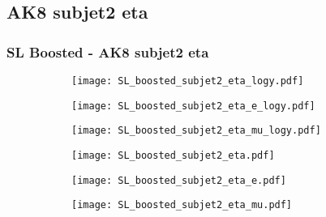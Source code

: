 \documentclass[aspectratio=169,8pt]{beamer}
\begin{document}
\subsection{AK8 subjet2 eta}
\begin{frame}
\frametitle{SL Boosted - AK8 subjet2 eta}
\begin{figure}
\captionsetup[subfigure]{labelformat=empty}
\begin{subfigure}{0.32\textwidth}
\texttt{[image: SL\_boosted\_subjet2\_eta\_logy.pdf]}
\vspace*{-0.15cm}
\end{subfigure}
\hfil
\begin{subfigure}{0.32\textwidth}
\texttt{[image: SL\_boosted\_subjet2\_eta\_e\_logy.pdf]}
\vspace*{-0.15cm}
\end{subfigure}
\hfil
\begin{subfigure}{0.32\textwidth}
\texttt{[image: SL\_boosted\_subjet2\_eta\_mu\_logy.pdf]}
\vspace*{-0.15cm}
\end{subfigure}
\hfil
\begin{subfigure}{0.32\textwidth}
\texttt{[image: SL\_boosted\_subjet2\_eta.pdf]}
\vspace*{-0.15cm}
\end{subfigure}
\hfil
\begin{subfigure}{0.32\textwidth}
\texttt{[image: SL\_boosted\_subjet2\_eta\_e.pdf]}
\vspace*{-0.15cm}
\end{subfigure}
\hfil
\begin{subfigure}{0.32\textwidth}
\texttt{[image: SL\_boosted\_subjet2\_eta\_mu.pdf]}
\vspace*{-0.15cm}
\end{subfigure}
\hfil
\end{figure}
\end{frame}
\newpage
\end{document}
